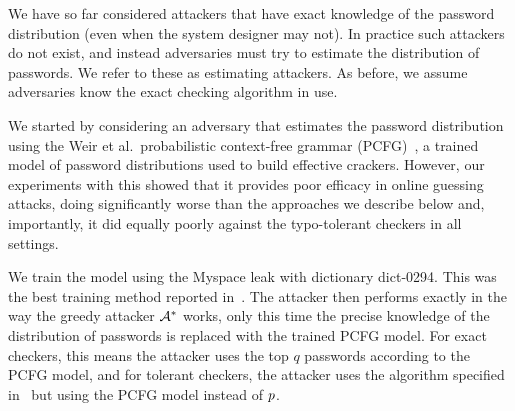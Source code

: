 We have so far considered attackers that have exact
knowledge of the password distribution (even when the system designer may
not). In practice such attackers do not exist, and instead adversaries must try to estimate
the distribution of passwords. We refer to these as estimating attackers. 
As before, we assume adversaries know the exact checking algorithm in use.

We started by considering an adversary that estimates the password distribution
using the Weir et al.~probabilistic context-free grammar
(PCFG)~\cite{weiretal:2009}, a trained model of password
distributions used to build effective crackers. However, our
experiments with this showed that it provides poor efficacy in online guessing
attacks, doing significantly worse than the approaches we describe below and,
importantly, it
did equally poorly against the typo-tolerant checkers in all settings.

\iffalse
We train the model
using the Myspace leak with dictionary dict-0294. This was the best training
method reported in~\cite{weiretal:2009}. The attacker then performs exactly in the
way the greedy attacker $\advA^*$ works, only this time the precise knowledge of the 
distribution of passwords is replaced with the trained PCFG model.  
For exact checkers, this means the attacker uses the top $q$ passwords according
to the PCFG model, and for tolerant checkers, the attacker uses 
the algorithm specified in~ but using the PCFG model
instead of $p$.


